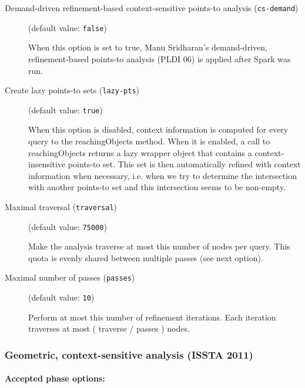 \documentclass{article}
\begin{document}
\begin{description}

\item[Demand-driven refinement-based context-sensitive points-to analysis ({\tt cs-demand})]
(default value: {\tt false})




When this option is set to true, Manu Sridharan's demand-driven,
refinement-based points-to analysis (PLDI 06) is applied after Spark
was run.
        					


\item[Create lazy points-to sets ({\tt lazy-pts})]
(default value: {\tt true})




When this option is disabled, context information is computed for every query to the reachingObjects method.
When it is enabled, a call to reachingObjects returns a lazy wrapper object that contains a context-insensitive
points-to set. This set is then automatically refined with context information when necessary, i.e.
when we try to determine the intersection with another points-to set and this intersection seems to be
non-empty.							
        					


\item[Maximal traversal ({\tt traversal})]
(default value: {\tt 75000})




Make the analysis traverse at most this number of nodes per query.
This quota is evenly shared between multiple passes (see next option).
        					


\item[Maximal number of passes ({\tt passes})]
(default value: {\tt 10})




Perform at most this number of refinement iterations.
Each iteration traverses at most ( traverse / passes ) nodes.
        					


\end{description}

\subsubsection{Geometric, context-sensitive analysis (ISSTA 2011)}


\paragraph{Accepted phase options:} 
\end{document}
